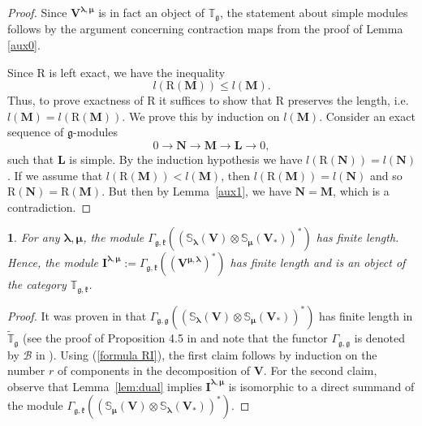 \documentclass[12pt,oneside,english]{amsart}
\numberwithin{equation}{section}
\numberwithin{figure}{section}
\theoremstyle{plain}
\theoremstyle{plain}
\theoremstyle{remark}
\theoremstyle{definition}
\theoremstyle{plain}
\theoremstyle{remark}
\theoremstyle{definition}
\theoremstyle{plain}
\newtheorem{cor}[thm]{\protect\corollaryname}
\theoremstyle{plain}
\theoremstyle{definition}
\providecommand{\corollaryname}{Corollary}
\newcommand{\bV}{\mathbf{V}}
\newcommand{\bL}{\mathbf{L}}
\newcommand{\bI}{\mathbf{I}}
\newcommand{\bM}{\mathbf{M}}
\newcommand{\bN}{\mathbf{N}}
\newcommand{\fg}{\mathfrak{g}}
\newcommand{\fk}{\mathfrak{k}}
\begin{document}
\begin{proof}
Since $\bV^{\boldsymbol{\lambda},{\boldsymbol{\mu}}}$ is in fact an object of $\mathbb T_{\fg}$, the statement about simple modules follows by the argument concerning contraction maps from the proof of Lemma \ref{aux0}.

Since $\mathrm{R}$ is left exact, we have  the inequality
  \begin{equation}\label{eqn:length}
    l(\mathrm{R}(\bM))\leq l(\bM).
    \end{equation}
Thus, to prove exactness of $\mathrm{R}$ it suffices to show  that $\mathrm{R}$ preserves the length, i.e. $l(\bM)=l(\mathrm{R}(\bM))$. We prove this by induction on $l(\bM)$.
Consider an exact sequence of $\fg$-modules
$$0\to \bN\to \bM\to \bL\to 0,$$
such that $\bL$ is simple. By the induction hypothesis we have $l(\mathrm{R}(\bN))=l(\bN)$. If we assume that $l(\mathrm{R}(\bM))<l(\bM)$, then $l(\mathrm{R}(\bM))=l(\bN)$ and so $\mathrm{R}(\bN)=\mathrm{R}(\bM)$.  But then by Lemma~\ref{aux1}, we have $\bN=\bM$, which is a contradiction.
\end{proof}

\begin{cor}\label{I finte length} For any $\boldsymbol{\lambda},\boldsymbol{\mu}$, the module
$\Gamma_{\fg,\fk}((\mathbb{S}_{\boldsymbol{\lambda}}(\bV)\otimes \mathbb{S}_{{\boldsymbol{\mu}}}(\bV_*))^*)$ has finite length.
Hence, the module $\bI^{\boldsymbol{\lambda},{\boldsymbol{\mu}}}:=\Gamma_{\fg,\fk}((\bV^{{\boldsymbol{\mu}},\boldsymbol{\lambda}} )^*)$ has finite length and is an object of the category $\mathbb T_{\fg,\fk}$.
\end{cor}

\begin{proof}
It was proven in \cite{DPS} that $\Gamma_{\fg,\fg}((\mathbb{S}_{\boldsymbol{\lambda}}(\bV)\otimes \mathbb{S}_{{\boldsymbol{\mu}}}(\bV_*))^*)$  has finite length in  $\widetilde{\mathbb T}_{\fg}$ (see the proof of Proposition 4.5 in \cite{DPS} and note that the functor $\Gamma_{\fg,\fg}$ is denoted by $\mathcal B$ in \cite{DPS}).  Using  (\ref{formula RI}), the first claim follows by induction on the number $r$ of components in the decomposition of $\bV$. For the second claim, observe that Lemma~\ref{lem:dual} implies $\bI^{\boldsymbol{\lambda},{\boldsymbol{\mu}}}$ is isomorphic to a direct summand of the module $\Gamma_{\fg,\fk}((\mathbb{S}_{\boldsymbol{\mu}}(\bV)\otimes \mathbb{S}_{{\boldsymbol{\lambda}}}(\bV_*))^*)$.
\end{proof}
\end{document}
